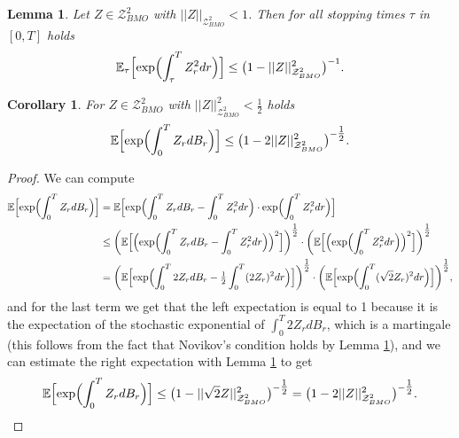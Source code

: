 \documentclass[10pt,a4paper]{article}
\theoremstyle{plain}
\newtheorem{Lemma}[Theorem]{Lemma}
\newtheorem{Corollary}[Theorem]{Corollary}
\theoremstyle{definition}
\numberwithin{equation}{section}
\begin{document}
\begin{Lemma}
\label{Lemma2.3}
Let $Z \in \mathcal{Z}_{BMO}^{2}$ with $||Z||_{\mathcal{Z}_{BMO}^{2}} < 1$. Then for all stopping times $\tau$ in $[0,T]$ holds
\begin{equation}
\label{equ:BMO.2}
\mathbb{E}_{\tau}\Bigl[\exp\Bigl(\int_{\tau}^{T}Z_{r}^{2}dr\Bigr)\Bigr] \leq \big(1-||Z||_{\mathcal{Z}_{BMO}^{2}}^{2}\big)^{-1}.
\end{equation}
\end{Lemma}

\begin{Corollary}
\label{Cor2.4}
For $Z \in \mathcal{Z}_{BMO}^{2}$ with $||Z||_{\mathcal{Z}_{BMO}^{2}}^{2} < \tfrac{1}{2}$ holds
\begin{equation}
\label{equ:BMO.3}
\mathbb{E}\Bigl[\exp\Bigl(\int_{0}^{T}Z_{r}dB_{r}\Bigr)\Bigr] \leq \big(1-2||Z||_{\mathcal{Z}_{BMO}^{2}}^{2}\big)^{-\tfrac{1}{2}}.
\end{equation}
\end{Corollary}

\begin{proof}
    

We can compute
\begin{align*}
\mathbb{E}\Bigl[\exp\Bigl(\int_{0}^{T}Z_{r}dB_{r}\Bigr)\Bigr] &= \mathbb{E}\Bigl[\exp\Bigl(\int_{0}^{T}Z_{r}dB_{r} - \int_{0}^{T}Z_{r}^{2}dr\Bigr) \cdot \exp\Bigl(\int_{0}^{T}Z_{r}^{2}dr\Bigr)\Bigr]\\
&\leq \biggl(\mathbb{E}\Bigl[\Bigl(\exp\Bigl(\int_{0}^{T}Z_{r}dB_{r} - \int_{0}^{T}Z_{r}^{2}dr\Bigr)\Bigr)^{2}\Bigr]\biggr)^{\tfrac{1}{2}} \cdot \biggl(\mathbb{E}\Bigl[\Bigl(\exp\Bigl(\int_{0}^{T}Z_{r}^{2}dr\Bigr)\Bigr)^{2}\Bigr]\biggr)^{\tfrac{1}{2}}\\
&= \biggl(\mathbb{E}\Bigl[\exp\Bigl(\int_{0}^{T}2Z_{r}dB_{r} - \tfrac{1}{2}\int_{0}^{T}(2Z_{r})^{2}dr\Bigr)\Bigr]\biggr)^{\tfrac{1}{2}} \cdot \biggl(\mathbb{E}\Bigl[\exp\Bigl(\int_{0}^{T}(\sqrt{2}Z_{r})^{2}dr\Bigr)\Bigr]\biggr)^{\tfrac{1}{2}},
\end{align*}
and for the last term we get that the left expectation is equal to 1 because it is the expectation of the stochastic exponential of $\int_{0}^{T}2Z_{r}dB_{r}$, which is a martingale (this follows from the fact that Novikov's condition holds by Lemma \ref{Lemma2.3}), and we can estimate the right expectation with Lemma \ref{Lemma2.3} to get
\[
\mathbb{E}\Bigl[\exp\Bigl(\int_{0}^{T}Z_{r}dB_{r}\Bigr)\Bigr] \leq \big(1-||\sqrt{2}Z||_{\mathcal{Z}_{BMO}^{2}}^{2}\big)^{-\tfrac{1}{2}} = \big(1-2||Z||_{\mathcal{Z}_{BMO}^{2}}^{2}\big)^{-\tfrac{1}{2}}.
\] 
\end{proof}
\end{document}
